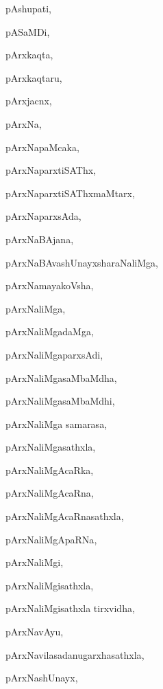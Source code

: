 \begin{multicols}{2}
{pAshupati}, \pageref{pAshupati}

{pASaMDi}, \pageref{pASaMDi}

{pArxkaqta}, \pageref{pArxkaqta}

{pArxkaqtaru}, \pageref{pArxkaqtaru}

{pArxjacnx}, \pageref{pArxjacnx}

{pArxNa}, \pageref{pArxNa}

{pArxNapaMcaka}, \pageref{pArxNapaMcaka}

{pArxNaparxtiSAThx}, \pageref{pArxNaparxtiSAThx}

{pArxNaparxtiSAThxmaMtarx}, \pageref{pArxNaparxtiSAThxmaMtarx}

{pArxNaparxsAda}, \pageref{pArxNaparxsAda}

{pArxNaBAjana}, \pageref{pArxNaBAjana}

{pArxNaBAvashUnayxsharaNaliMga}, \pageref{pArxNaBAvashUnayxsharaNaliMga}

{pArxNamayakoVsha}, \pageref{pArxNamayakoVsha}

{pArxNaliMga}, \pageref{pArxNaliMga}

{pArxNaliMgadaMga}, \pageref{pArxNaliMgadaMga}

{pArxNaliMgaparxsAdi}, \pageref{pArxNaliMgaparxsAdi}

{pArxNaliMgasaMbaMdha}, \pageref{pArxNaliMgasaMbaMdha}

{pArxNaliMgasaMbaMdhi}, \pageref{pArxNaliMgasaMbaMdhi}

{pArxNaliMga samarasa}, \pageref{pArxNaliMga samarasa}

{pArxNaliMgasathxla}, \pageref{pArxNaliMgasathxla}

{pArxNaliMgAcaRka}, \pageref{pArxNaliMgAcaRka}

{pArxNaliMgAcaRna}, \pageref{pArxNaliMgAcaRna}

{pArxNaliMgAcaRnasathxla}, \pageref{pArxNaliMgAcaRnasathxla}

{pArxNaliMgApaRNa}, \pageref{pArxNaliMgApaRNa}

{pArxNaliMgi}, \pageref{pArxNaliMgi}

{pArxNaliMgisathxla}, \pageref{pArxNaliMgisathxla}

{pArxNaliMgisathxla tirxvidha}, \pageref{pArxNaliMgisathxla tirxvidha}

{pArxNavAyu}, \pageref{pArxNavAyu}

{pArxNavilasadanugarxhasathxla}, \pageref{pArxNavilasadanugarxhasathxla}

{pArxNashUnayx}, \pageref{pArxNashUnayx}


\end{multicols}
